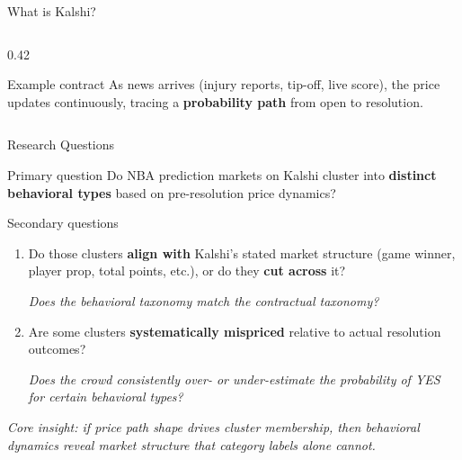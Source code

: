 \documentclass[10pt, aspectratio=169]{beamer}
\begin{document}
\begin{frame}{What is Kalshi?}
\begin{columns}[T]
\begin{column}{0.42\textwidth}
\begin{block}{Example contract}
        \medskip
        As news arrives (injury reports, tip-off, live score),
        the price updates continuously, tracing a
        \textbf{probability path} from open to resolution.
      \end{block}
    \end{column}
  \end{columns}
\end{frame}

\begin{frame}{Research Questions}
  \begin{alertblock}{Primary question}
    Do NBA prediction markets on Kalshi cluster into
    \textbf{distinct behavioral types} based on
    pre-resolution price dynamics?
  \end{alertblock}

  \bigskip
  \begin{block}{Secondary questions}
    \begin{enumerate}
      \item[\textbf{Q2}] Do those clusters \textbf{align with}
            Kalshi's stated market structure (game winner, player prop,
            total points, etc.), or do they \textbf{cut across} it?

            \smallskip
            \textit{Does the behavioral taxonomy match the contractual taxonomy?}

      \smallskip
      \item[\textbf{Q3}] Are some clusters \textbf{systematically
            mispriced} relative to actual resolution outcomes?

            \smallskip
            \textit{Does the crowd consistently over- or under-estimate
            the probability of YES for certain behavioral types?}
    \end{enumerate}
  \end{block}

  \bigskip
  \begin{center}
    \small
    \textit{Core insight: if price \emph{path shape} drives cluster membership,
    then behavioral dynamics reveal market structure that category labels alone cannot.}
  \end{center}
\end{frame}
\end{document}
